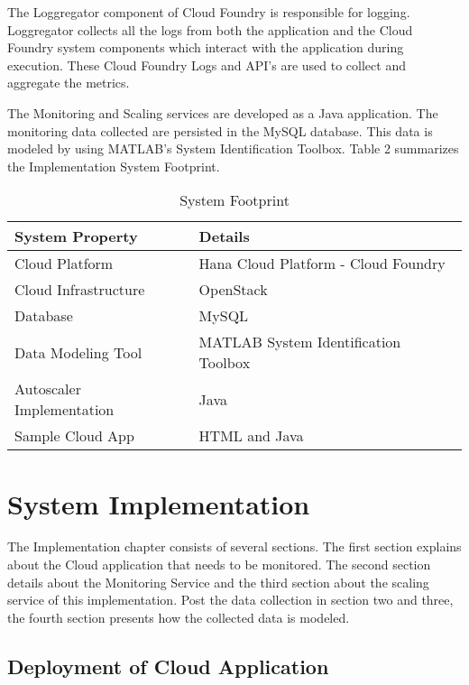 \documentclass[article,type=msc,colorback,12pt,accentcolor=tud7b,table]{tudthesis}
\begin{document}
	The Loggregator component of Cloud Foundry is responsible for logging. Loggregator collects all the logs from both the application and the Cloud Foundry system components which interact with the application during execution. These Cloud Foundry Logs and API's are used to collect and aggregate the metrics. 
	
	The Monitoring and Scaling services are developed as a Java application. The monitoring data collected are persisted in the MySQL database. This data is modeled by using MATLAB's System Identification Toolbox. Table 2 summarizes the Implementation System Footprint.

\begin{table}[]
	\centering
	\caption{System Footprint}
	\label{my-label}
	\begin{tabular}{|l|l|}
		\hline
		\rowcolor[HTML]{FFCB2F} 
		\textbf{System Property}  & \textbf{Details}                     \\ \hline
		Cloud Platform            & Hana Cloud Platform - Cloud Foundry  \\ \hline
		Cloud Infrastructure      & OpenStack                            \\ \hline
		Database                  & MySQL                                \\ \hline
		Data Modeling Tool        & MATLAB System Identification Toolbox \\ \hline
		Autoscaler Implementation & Java                                 \\ \hline
		Sample Cloud App          & HTML and Java                        \\ \hline
	\end{tabular}
\end{table}

 \cleardoublepage
 \section{System Implementation}
The Implementation chapter consists of several sections. The first section explains about the Cloud application that needs to be monitored. The second section details about the Monitoring Service and the third section about the scaling service of this implementation. Post the data collection in section two and three, the fourth section presents how the collected data is modeled. 
 
	\subsection{Deployment of Cloud Application} 
\end{document}
